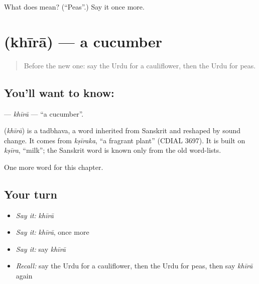 \begin{tcolorbox}[breakable,colback=teal!4,colframe=teal!35!black,title={Before you move on}]
What does  mean? (\textquotedblleft{}Peas\textquotedblright{}.) Say it once more.
\end{tcolorbox}
\section[\texorpdfstring{\ur{کھیرا} (khīrā)}{کھیرا (khīrā)}]{ (khīrā) — a cucumber}

\label{lesson:UR-C115-khira}



\begin{quote}
Before the new one: say the Urdu for a cauliflower, then the Urdu for peas.
\end{quote}

\subsection*{You'll want to know: }
\textbf{} — \emph{khīrā} — \textquotedblleft{}a cucumber\textquotedblright{}.

\begin{cousinweb}
\textbf{} (\emph{khīrā}) is a tadbhava, a word inherited from Sanskrit and reshaped by sound change. It comes from \emph{kṣīraka}, \textquotedblleft{}a fragrant plant\textquotedblright{} (CDIAL 3697). It is built on \emph{kṣīra}, \textquotedblleft{}milk\textquotedblright{}; the Sanskrit word is known only from the old word-lists.
\end{cousinweb}

\begin{grammarlens}[title={What you've built}]
One more word for this chapter.
\end{grammarlens}

\subsection*{Your turn}
\begin{itemize}
\raggedright
  \item \emph{Say it:} \emph{khīrā}
  \item \emph{Say it:} \emph{khīrā}, once more
  \item \emph{Say it:} say \emph{khīrā}
  \item \emph{Recall:} say the Urdu for a cauliflower, then the Urdu for peas, then say \emph{khīrā} again
\end{itemize}

